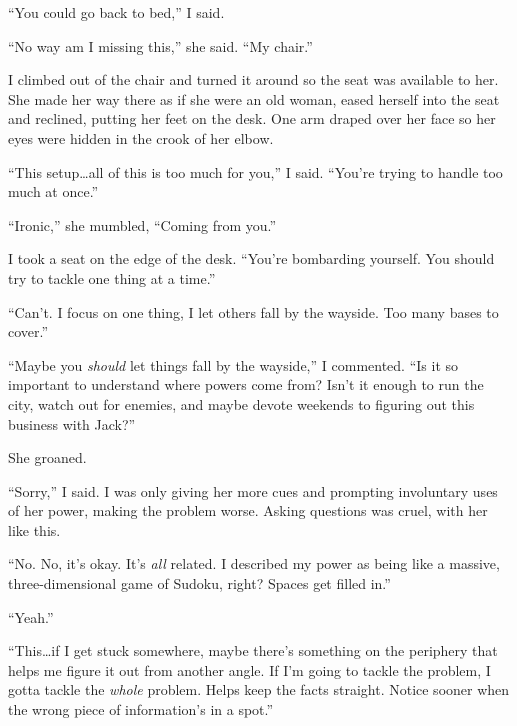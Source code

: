 ``You could go back to bed,'' I said.



``No way am I missing this,'' she said.  ``My chair.''



I climbed out of the chair and turned it around so the seat was available to her.  She made her way there as if she were an old woman, eased herself into the seat and reclined, putting her feet on the desk.  One arm draped over her face so her eyes were hidden in the crook of her elbow.



``This setup\ldots all of this is too much for you,'' I said.  ``You're trying to handle too much at once.''



``Ironic,'' she mumbled, ``Coming from you.''



I took a seat on the edge of the desk.  ``You're bombarding yourself.  You should try to tackle one thing at a time.''



``Can't.  I focus on one thing, I let others fall by the wayside.  Too many bases to cover.''



``Maybe you \emph{should }let things fall by the wayside,'' I commented.  ``Is it so important to understand where powers come from?  Isn't it enough to run the city, watch out for enemies, and maybe devote weekends to figuring out this business with Jack?''



She groaned.



``Sorry,'' I said.  I was only giving her more cues and prompting involuntary uses of her power, making the problem worse.  Asking questions was cruel, with her like this.



``No.  No, it's okay.  It's \emph{all} related.  I described my power as being like a massive, three-dimensional game of Sudoku, right?  Spaces get filled in.''



``Yeah.''



``This\ldots if I get stuck somewhere, maybe there's something on the periphery that helps me figure it out from another angle.  If I'm going to tackle the problem, I gotta tackle the \emph{whole} problem.  Helps keep the facts straight.  Notice sooner when the wrong piece of information's in a spot.''



